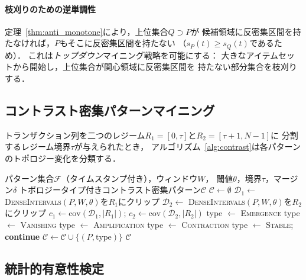 \paragraph{枝刈りのための逆単調性}
定理~\ref{thm:anti_monotone}により，上位集合$Q \supset P$が
候補領域に反密集区間を持たなければ，$P$もそこに反密集区間を持たない
（$s_P(t) \geq s_Q(t)$であるため）．
これは\emph{トップダウン}マイニング戦略を可能にする：
大きなアイテムセットから開始し，上位集合が関心領域に反密集区間を
持たない部分集合を枝刈りする．

\subsection{コントラスト密集パターンマイニング}\label{sec:contrast_algo}

トランザクション列を二つのレジーム$R_1 = [0, \tau]$と$R_2 = [\tau+1, N-1]$に
分割するレジーム境界$\tau$が与えられたとき，
アルゴリズム~\ref{alg:contrast}は各パターンのトポロジー変化を分類する．

\begin{algorithm}[t]
\caption{コントラスト密集パターンマイニング}
\label{alg:contrast}
\begin{algorithmic}[1]
\REQUIRE パターン集合$\mathcal{F}$（タイムスタンプ付き），ウィンドウ$W$，
  閾値$\theta$，境界$\tau$，マージン$\delta$
\ENSURE トポロジータイプ付きコントラスト密集パターン$\mathcal{C}$
\STATE $\mathcal{C} \leftarrow \emptyset$
  \STATE $\mathcal{D}_1 \leftarrow$ \textsc{DenseIntervals}$(P, W,
    \theta)$を$R_1$にクリップ
  \STATE $\mathcal{D}_2 \leftarrow$ \textsc{DenseIntervals}$(P, W,
    \theta)$を$R_2$にクリップ
  \STATE $c_1 \leftarrow \text{cov}(\mathcal{D}_1, |R_1|)$;
    $c_2 \leftarrow \text{cov}(\mathcal{D}_2, |R_2|)$
    \STATE type $\leftarrow$ \textsc{Emergence}
    \STATE type $\leftarrow$ \textsc{Vanishing}
    \STATE type $\leftarrow$ \textsc{Amplification}
    \STATE type $\leftarrow$ \textsc{Contraction}
  \ELSE
    \STATE type $\leftarrow$ \textsc{Stable}; \textbf{continue}
  \ENDIF
  \STATE $\mathcal{C} \leftarrow \mathcal{C} \cup \{(P, \text{type})\}$
\ENDFOR
\RETURN $\mathcal{C}$
\end{algorithmic}
\end{algorithm}

\subsection{統計的有意性検定}\label{sec:permtest_algo}

